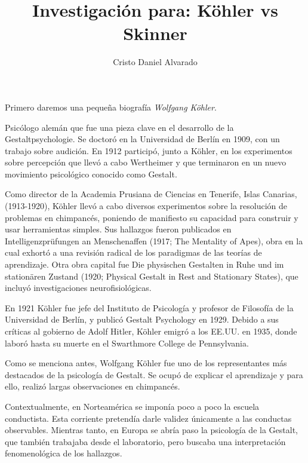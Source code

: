 \documentclass[12pt]{article}
\theoremstyle{largebreak}
\begin{document}
    \setlength{\parskip}{5pt} %
    \setlength{\parindent}{12pt} %
    \title{Investigación para: Köhler vs Skinner}
    \author{Cristo Daniel Alvarado}
    \maketitle

    Primero daremos una pequeña biografía \textit{Wolfgang Köhler}.

    Psicólogo alemán que fue una pieza clave en el desarrollo de la Gestaltpsychologie. Se doctoró en la Universidad de Berlín en 1909, con un trabajo sobre audición. En 1912 participó, junto a Köhler, en los experimentos sobre percepción que llevó a cabo Wertheimer y que terminaron en un nuevo movimiento psicológico conocido como Gestalt.

    Como director de la Academia Prusiana de Ciencias en Tenerife, Islas Canarias, (1913-1920), Köhler llevó a cabo diversos experimentos sobre la resolución de problemas en chimpancés, poniendo de manifiesto su capacidad para construir y usar herramientas simples. Sus hallazgos fueron publicados en Intelligenzprüfungen an Menschenaffen (1917; The Mentality of Apes), obra en la cual exhortó a una revisión radical de los paradigmas de las teorías de aprendizaje. Otra obra capital fue Die physischen Gestalten in Ruhe und im stationären Zustand (1920; Physical Gestalt in Rest and Stationary States), que incluyó investigaciones neurofisiológicas.

    En 1921 Köhler fue jefe del Instituto de Psicología y profesor de Filosofía de la Universidad de Berlín, y publicó Gestalt Psychology en 1929. Debido a sus críticas al gobierno de Adolf Hitler, Köhler emigró a los EE.UU. en 1935, donde laboró hasta su muerte en el Swarthmore College de Pennsylvania.

    Como se menciona antes, Wolfgang Köhler fue uno de los representantes más destacados de la psicología de Gestalt. Se ocupó de explicar el aprendizaje y para ello, realizó largas observaciones en chimpancés.

    Contextualmente, en Norteamérica se imponía poco a poco la escuela conductista. Esta corriente pretendía darle validez únicamente a las conductas observables. Mientras tanto, en Europa se abría paso la psicología de la Gestalt, que también trabajaba desde el laboratorio, pero buscaba una interpretación fenomenológica de los hallazgos.
        
\end{document}
